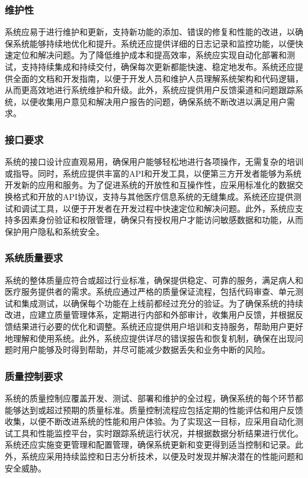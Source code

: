 \subsubsection{维护性}
系统应易于进行维护和更新，支持新功能的添加、错误的修复和性能的改进，以确保系统能够持续地优化和提升。系统还应提供详细的日志记录和监控功能，以便快速定位和解决问题。为了降低维护成本和提高效率，系统应实现自动化部署和测试，支持持续集成和持续交付，确保每次更新都能快速、稳定地发布。系统还应提供全面的文档和开发指南，以便于开发人员和维护人员理解系统架构和代码逻辑，从而更高效地进行系统维护和升级。此外，系统应提供用户反馈渠道和问题跟踪系统，以便收集用户意见和解决用户报告的问题，确保系统不断改进以满足用户需求。

\subsubsection{接口要求}
系统的接口设计应直观易用，确保用户能够轻松地进行各项操作，无需复杂的培训或指导。同时，系统应提供丰富的API和开发工具，以便第三方开发者能够为系统开发新的应用和服务。为了促进系统的开放性和互操作性，应采用标准化的数据交换格式和开放的API协议，支持与其他医疗信息系统的无缝集成。系统还应提供测试和调试工具，以便于开发者在开发过程中快速定位和解决问题。此外，系统应支持多因素身份验证和权限管理，确保只有授权用户才能访问敏感数据和功能，从而保护用户隐私和系统安全。

\subsubsection{系统质量要求}
系统的整体质量应符合或超过行业标准，确保提供稳定、可靠的服务，满足病人和医疗服务提供者的需求。系统应通过严格的质量保证流程，包括代码审查、单元测试和集成测试，以确保每个功能在上线前都经过充分的验证。为了确保系统的持续改进，应建立质量管理体系，定期进行内部和外部审计，收集用户反馈，并根据反馈结果进行必要的优化和调整。系统还应提供用户培训和支持服务，帮助用户更好地理解和使用系统。此外，系统应提供详尽的错误报告和恢复机制，确保在出现问题时用户能够及时得到帮助，并尽可能减少数据丢失和业务中断的风险。

\subsubsection{质量控制要求}
系统的质量控制应覆盖开发、测试、部署和维护的全过程，确保系统的每个环节都能够达到或超过预期的质量标准。质量控制流程应包括定期的性能评估和用户反馈收集，以便不断改进系统的性能和用户体验。为了实现这一目标，应采用自动化测试工具和性能监控平台，实时跟踪系统运行状况，并根据数据分析结果进行优化。系统还应实施变更管理和配置管理，确保系统更新和变更得到适当控制和记录。此外，系统应采用持续监控和日志分析技术，以便及时发现并解决潜在的性能问题和安全威胁。

